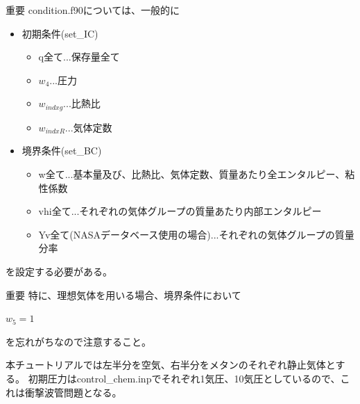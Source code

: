 \documentclass{jsarticle}
\begin{document}
\begin{itembox}[l]{重要}
condition.f90については、一般的に
\begin{itemize}
\item 初期条件(set\_IC)
\begin{itemize}
\item q全て...保存量全て
\item $w_4$...圧力
\item $w_{indxg}$...比熱比
\item $w_{indxR}$...気体定数
\end{itemize}
\item 境界条件(set\_BC)
\begin{itemize}
\item w全て...基本量及び、比熱比、気体定数、質量あたり全エンタルピー、粘性係数
\item vhi全て...それぞれの気体グループの質量あたり内部エンタルピー
\item Yv全て(NASAデータベース使用の場合)...それぞれの気体グループの質量分率
\end{itemize}
\end{itemize}
を設定する必要がある。
\end{itembox}

\begin{itembox}[l]{重要}
特に、理想気体を用いる場合、境界条件において
\begin{center}
$w_5=1$
\end{center}
を忘れがちなので注意すること。
\end{itembox}

本チュートリアルでは左半分を空気、右半分をメタンのそれぞれ静止気体とする。
初期圧力はcontrol\_chem.inpでそれぞれ1気圧、10気圧としているので、これは衝撃波管問題となる。
\end{document}
